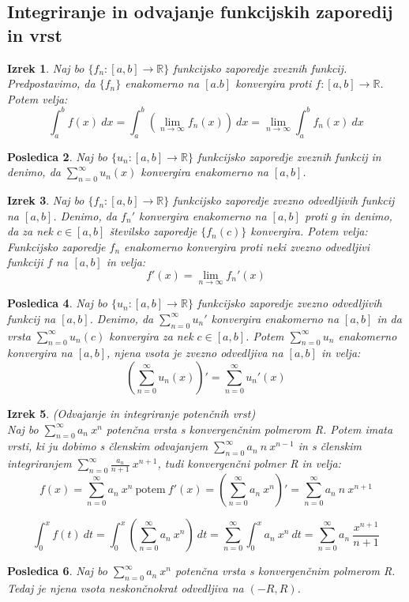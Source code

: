 \documentclass[11pt]{article}
\newtheorem{Izrek}{{\sc Izrek}}[section]
\newtheorem{Posledica}[Izrek]{{\sc Posledica}}
\begin{document}
\subsection{Integriranje in odvajanje funkcijskih zaporedij in vrst}
\begin{Izrek}
	Naj bo $\{f_n :[a,b]\to \mathbb{R} \}$ funkcijsko zaporedje zveznih funkcij. Predpostavimo, da $\{f_n\}$ enakomerno na $[a.b]$ konvergira proti $f:[a,b] \to \mathbb{R}$. Potem velja:
	$$\int_{a}^{b}{f(x)\ dx} = \int_{a}^{b}{(\lim\limits_{n\to \infty}{f_n(x)}) \ dx} = \lim\limits_{n\to \infty}{\int_{a}^{b}{f_n(x)}\ dx} $$
\end{Izrek}
\begin{Posledica}
	Naj bo $\{u_n: [a,b] \to \mathbb{R}\}$ funkcijsko zaporedje zveznih funkcij in denimo, da $\sum_{n=0}^{\infty}{u_n(x)}$ konvergira enakomerno na $[a,b]$.
\end{Posledica}
\begin{Izrek}
	Naj bo $\{f_n: [a,b] \to \mathbb{R}\}$ funkcijsko zaporedje zvezno odvedljivih funkcij na $[a,b]$. Denimo, da $f_n'$ konvergira enakomerno na $[a,b]$ proti $g$ in denimo, da za nek $c\in [a,b]$ številsko zaporedje $\{f_n(c) \} $ konvergira. Potem velja:
	\\
	Funkcijsko zaporedje $f_n$ enakomerno konvergira proti neki zvezno odvedljivi funkciji $f$ na $[a,b]$ in velja:
	$$f'(x) = \lim\limits_{n\to \infty}{f_n'(x)}$$
\end{Izrek}
\begin{Posledica}
	Naj bo $\{u_n: [a,b] \to \mathbb{R}\}$ funkcijsko zaporedje zvezno odvedljivih funkcij na $[a,b]$.
	Denimo, da $\sum_{n=0}^{\infty}{u_n'}$ konvergira enakomerno na $[a,b]$ in da vrsta $\sum_{n=0}^{\infty}{u_n(c)}$ konvergira za nek $c\in [a,b]$. Potem $\sum_{n=0}^{\infty}{u_n}$ enakomerno konvergira na $[a,b]$, njena vsota je zvezno odvedljiva na $[a,b]$ in velja:
	$$(\sum_{n=0}^{\infty}{u_n(x)})' = \sum_{n=0}^{\infty}{u_n'(x)}$$
\end{Posledica}
\begin{Izrek}
	(Odvajanje in integriranje potenčnih vrst)
	\\ 
	Naj bo $\sum_{n=0}^{\infty}{a_n \ x^n}$ potenčna vrsta s konvergenčnim polmerom R. Potem imata vrsti, ki ju dobimo s členskim odvajanjem $\sum_{n=0}^{\infty}{a_n \ n\ x^{n-1}}$ in s členskim integriranjem $\sum_{n=0}^{\infty}{\frac{a_n}{n+1} \ x^{n+1}}$, tudi konvergenčni polmer R in velja:
	\\
	$$f(x) = \sum_{n=0}^{\infty}{a_n \ x^n} \ \textrm{potem} \ f'(x) = (\sum_{n=0}^{\infty}{a_n \ x^n})' = \sum_{n=0}^{\infty}{a_n \ n\ x^{n+1}}$$
	
	$$\int_{0}^{x}{f(t) \ dt} = \int_{0}^{x}{(\sum_{n=0}^{\infty}{a_n \ x^n}) \ dt} = \sum_{n=0}^{\infty}{ \int_{0}^{x}{a_n \ x^n \ dt}}= \sum_{n=0}^{\infty}{a_n \ \frac{x^{n+1}}{n+1}}$$
\end{Izrek}
\begin{Posledica}
	Naj bo  $\sum_{n=0}^{\infty}{a_n \ x^n}$ potenčna vrsta s konvergenčnim polmerom R. Tedaj je njena vsota neskončnokrat odvedljiva na $(-R, R)$.
\end{Posledica}
\end{document}
